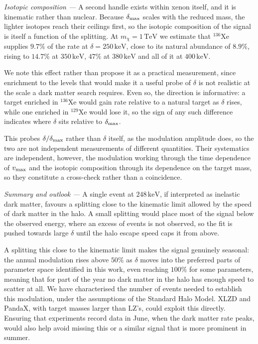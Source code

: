 \documentclass[aps,prl,twocolumn,superscriptaddress,nofootinbib,floatfix]{revtex4-2}
\newcommand{\keV}{\ensuremath{\,\mathrm{keV}}}
\newcommand{\TeV}{\ensuremath{\,\mathrm{TeV}}}
\newcommand{\mchi}{\ensuremath{m_\chi}}
\newcommand{\shortsection}[1]{\emph{#1 —}}
\begin{document}
\shortsection{Isotopic composition} 
 A second handle exists within xenon itself, and it is kinematic rather than nuclear. 
 Because $\delta_{\rm max}$ scales with the reduced mass, the lighter isotopes reach their ceilings first, so the isotopic composition of the signal is itself a function of the splitting.
 At $\mchi = 1\TeV$ we estimate that $^{136}$Xe supplies $9.7\%$ of the rate at $\delta = 250\keV$, close to its natural abundance of $8.9\%$, rising to $14.7\%$ at $350\keV$, $47\%$ at $380\keV$ and all of it at $400\keV$.

We note this effect rather than propose it as a practical measurement, since enrichment to the levels that would make it a useful probe of $\delta$ is not realistic at the scale a dark
matter search requires. 
Even so, the direction is informative: a target enriched in $^{136}$Xe would gain rate relative to a natural target as $\delta$ rises, while one enriched in $^{129}$Xe would lose it, so the sign of any such difference indicates where $\delta$ sits relative to $\delta_{\rm max}$. 

This probes $\delta/\delta_{\rm max}$ rather than $\delta$ itself, as the modulation amplitude does, so the two are not independent measurements of different quantities. 
Their systematics are independent, however, the modulation working through the time dependence of $v_{\rm max}$ and the isotopic composition through its dependence on the target mass, so they
constitute a cross-check rather than a coincidence.

\shortsection{Summary and outlook}
A single event at $248\keV$, if interpreted as inelastic dark matter, favours a splitting close to the kinematic limit allowed by the speed of dark matter in the halo. 
A small splitting would place most of the signal below the observed energy, where an excess of events is not observed, 
so the fit is pushed towards large $\delta$ until the halo escape speed caps it from above.

A splitting this close to the kinematic limit makes the signal genuinely seasonal:
the annual modulation rises above $50\%$ as $\delta$ moves into the preferred parts of parameter space identified in this work, even reaching $100\%$ for
some parameters, meaning that for part of the year no dark matter in the halo has enough
speed to scatter at all. 
We have characterised the number of events needed to establish this modulation, under the assumptions of the Standard Halo Model. 
XLZD and PandaX, with target masses larger than LZ's, could exploit this directly. 
Ensuring that experiments record data in June, when the dark matter rate peaks, would also help avoid missing this or a similar signal that is more prominent in summer.
\end{document}
